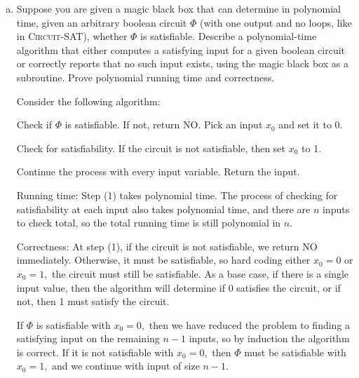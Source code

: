 \documentclass{article}
\begin{document}
\begin{enumerate}[(a)]
	\item Suppose you are given a magic black box that can determine in polynomial time, given an arbitrary boolean circuit $\Phi$ (with one output and no loops, like in \textsc{Circuit-SAT}), whether $\Phi$ is satisfiable. Describe a polynomial-time algorithm that either computes a satisfying input for a given boolean circuit or correctly reports that no such input exists, using the magic black box as a subroutine.  Prove polynomial running time and correctness.
		\begin{soln}
			Consider the following algorithm:
			\begin{enumerate}[(1)]
				\ii Check if $\Phi$ is satisfiable. If not, return NO.
				\ii Pick an input $x_0$ and set it to 0. 
				\begin{enumerate}[(a)]
					\ii Check for satisfiability. If the circuit is not satisfiable, then set $x_0$ to 1.
				\end{enumerate}
				\ii Continue the process with every input variable.
				\ii Return the input.
			\end{enumerate}

			Running time: Step (1) takes polynomial time. The process of checking for satisfiability at each input also takes polynomial time, and there are $n$ inputs to check total, so the total running time is still polynomial in $n.$

			Correctness: At step (1), if the circuit is not satisfiable, we return NO immediately. Otherwise, it must be satisfiable, so hard coding either $x_0=0$ or $x_0=1,$ the circuit must still be satisfiable. As a base case, if there is a single input value, then the algorithm will determine if 0 satisfies the circuit, or if not, then 1 must satisfy the circuit.
			
			If $\Phi$ is satisfiable with $x_0=0,$ then we have reduced the problem to finding a satisfying input on the remaining $n-1$ inputs, so by induction the algorithm is correct. If it is not satisfiable with $x_0=0,$ then $\Phi$ must be satisfiable with $x_0=1,$ and we continue with input of size $n-1.$
		\end{soln}

\end{enumerate}
\end{document}
